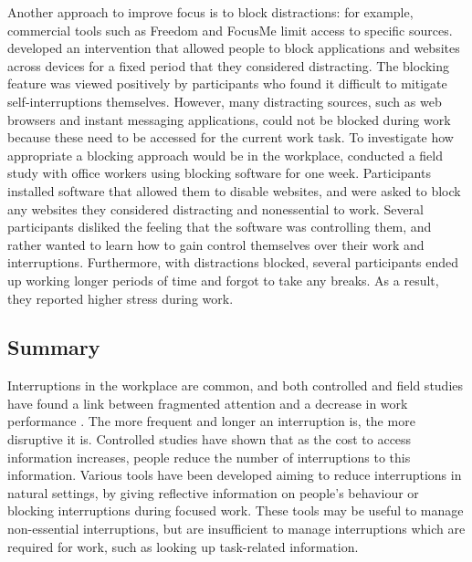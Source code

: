 Another approach to improve focus is to block distractions: for example, commercial tools such as Freedom \citep{Freedom} and FocusMe \citep{FocusMe} limit access to specific sources. \citet{Kim2017} developed an intervention that allowed people to block applications and websites across devices for a fixed period that they considered distracting. The blocking feature was viewed positively by participants who found it difficult to mitigate self-interruptions themselves. However, many distracting sources, such as web browsers and instant messaging applications, could not be blocked during work because these need to be accessed for the current work task. To investigate how appropriate a blocking approach would be in the workplace, \citet{Mark2018} conducted a field study with office workers using blocking software for one week. Participants installed software that allowed them to disable websites, and were asked to block any websites they considered distracting and nonessential to work. Several participants disliked the feeling that the software was controlling them, and rather wanted to learn how to gain control themselves over their work and interruptions. Furthermore, with distractions blocked, several participants ended up working longer periods of time and forgot to take any breaks. As a result, they reported higher stress during work.

\subsection{Summary}
Interruptions in the workplace are common, and both controlled and field studies have found a link between fragmented attention and a decrease in work performance \citep{Bailey2001, Carrier2015}. The more frequent and longer an interruption is, the more disruptive it is. Controlled studies have shown that as the cost to access information increases, people reduce the number of interruptions to this information. Various tools have been developed aiming to reduce interruptions in natural settings, by giving reflective information on people's behaviour or blocking interruptions during focused work. These tools may be useful to manage non-essential interruptions, but are insufficient to manage interruptions which are required for work, such as looking up task-related information. 

